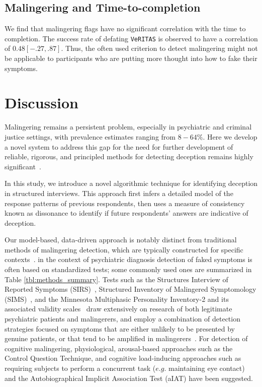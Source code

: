\documentclass[onecolumn,10pt]{IEEEtran}
\def\vrts{\texttt{VeRITAS}\xspace}
\begin{document}
\subsection*{Malingering and Time-to-completion}
We find that malingering flags have no significant correlation with the time to completion. The success rate of defating \vrts is observed to have a correlation of $0.48 [-.27, .87]$. Thus, the often used criterion to detect malingering might not be applicable to participants who are putting more thought into how to fake their symptoms.



\section*{Discussion}
Malingering remains a persistent problem, especially in psychiatric and criminal justice settings, with prevalence estimates ranging from $8-64\%$\cite{mcdermott2013malingering,schmidt2020base,matto2019systematic}. Here we develop a novel system to address this gap for  the need for further development of reliable, rigorous, and principled methods for detecting deception remains highly significant~\cite{DePaulo2003}.

{\color{Red1} In this study, we introduce a novel algorithmic technique for identifying  deception in structured interviews. This approach first infers a detailed model of the response patterns of previous respondents, then uses a measure of consistency known as dissonance to identify if future respondents' answers are indicative of deception.}

Our model-based, data-driven approach is notably distinct from traditional methods of malingering detection, which are typically constructed for  specific contexts~\cite{walczyk2018review}. in the context of  psychiatric diagnosis detection of faked symptoms is often based on standardized tests; some commonly used ones are summarized in Table \ref{tbl:methods_summary}. Tests such as the Structures Interview of Reported Symptoms (SIRS)~\cite{Wong2005}, Structured Inventory of Malingered Symptomology (SIMS)~\cite{smith1997detection}, and the Minnesota Multiphasic Personality Inventory-2 and its associated validity scales~\cite{ben2012interpreting} draw extensively on research of both legitimate psychiatric patients and malingerers, and employ a combination of detection strategies focused on symptoms that are either unlikely to be presented by genuine patients, or that tend to be amplified in malingerers~\cite{rogers2008determinations}. For detection of cognitive malingering, physiological, arousal-based approaches such as the Control Question Technique\cite{vrij2001killed}, and cognitive load-inducing approaches such as requiring subjects to perform a concurrent task ($e.g.$ maintaining eye contact) and the Autobiographical Implicit Association Test (aIAT) have been suggested.
\end{document}
